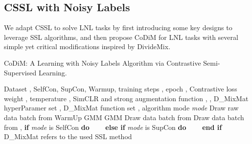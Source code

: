 \documentclass[letterpaper]{article} \usepackage{aaai22}  \usepackage{times}  \usepackage{helvet}  \usepackage{courier}  \usepackage[hyphens]{url}  \usepackage{graphicx} \usepackage{subfigure}
\begin{document}
\subsection{CSSL with Noisy Labels}
We adapt CSSL to solve LNL tasks by first introducing some key designs to leverage SSL algorithms, and then propose CoDiM for LNL tasks with several simple yet critical modifications inspired by DivideMix.
\begin{algorithm}[!h]
\renewcommand{\algorithmicrequire}{\textbf{Input:}}
\renewcommand{\algorithmicensure}{\textbf{Output:}}
\renewcommand{\algorithmiccomment}{ \ \ \ // }
\caption{CoDiM: A Learning with Noisy Labels Algorithm via Contrastive Semi-Supervised Learning. }
\begin{algorithmic}[1]
\REQUIRE Dataset , SelfCon, SupCon, Warmup, training steps , epoch , Contrastive loss weight , temperature , SimCLR and strong augmentation function , , D\_MixMat hyperParamer set , D\_MixMat function set , algorithm mode \textit{mode}
\WHILE{} 
    \STATE Draw raw data batch  from  
    \STATE   {}
    \STATE   
    \STATE 
    \STATE 
\ENDWHILE
\STATE 
\STATE 
{}
\STATE WarmUp 
\WHILE{} 
    \STATE GMM
    \STATE GMM
    \FOR{}
    \STATE Draw data batch  from   
    \STATE Draw data batch  from   
    \STATE , 
\STATE \textbf{if} \textit{mode} is SelfCon \textbf{do}
    \STATE \ \ \ \ 
    \STATE \textbf{else if} \textit{mode} is SupCon \textbf{do}
    \STATE \ \ \ \ 
    \STATE \textbf{end if}
    \STATE D\_MixMat
    \STATE \Comment{} refers to the used SSL method
    \STATE  
    \STATE     
    \ENDFOR
    \ENDWHILE
\ENDWHILE
\end{algorithmic}
\label{alg:ALG2}
\end{algorithm}
\end{document}
